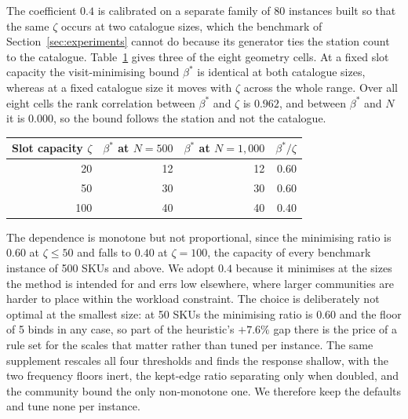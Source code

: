 \documentclass[]{interact}
\begin{document}
The coefficient $0.4$ is calibrated on a separate family of 80 instances built so that the same $\zeta$ occurs at two catalogue sizes, which the benchmark of Section~\ref{sec:experiments} cannot do because its generator ties the station count to the catalogue. Table~\ref{tab:capsweep} gives three of the eight geometry cells. At a fixed slot capacity the visit-minimising bound $\beta^\ast$ is identical at both catalogue sizes, whereas at a fixed catalogue size it moves with $\zeta$ across the whole range. Over all eight cells the rank correlation between $\beta^\ast$ and $\zeta$ is $0.962$, and between $\beta^\ast$ and $N$ it is $0.000$, so the bound follows the station and not the catalogue.

\begin{table}[H]
\centering
{}
{\small\begin{tabular*}{\textwidth}{@{\extracolsep{\fill}}rrrr@{}}
\toprule
Slot capacity $\zeta$ & $\beta^\ast$ at $N=500$ & $\beta^\ast$ at $N=1{,}000$ & $\beta^\ast/\zeta$ \\
\midrule
20  & 12 & 12 & 0.60 \\
50  & 30 & 30 & 0.60 \\
100 & 40 & 40 & 0.40 \\
\bottomrule
\end{tabular*}}
\label{tab:capsweep}
\end{table}

The dependence is monotone but not proportional, since the minimising ratio is $0.60$ at $\zeta\le 50$ and falls to $0.40$ at $\zeta=100$, the capacity of every benchmark instance of 500 SKUs and above. We adopt $0.4$ because it minimises at the sizes the method is intended for and errs low elsewhere, where larger communities are harder to place within the workload constraint. The choice is deliberately not optimal at the smallest size: at 50 SKUs the minimising ratio is $0.60$ and the floor of 5 binds in any case, so part of the heuristic's $+7.6\%$ gap there is the price of a rule set for the scales that matter rather than tuned per instance. The same supplement rescales all four thresholds and finds the response shallow, with the two frequency floors inert, the kept-edge ratio separating only when doubled, and the community bound the only non-monotone one. We therefore keep the defaults and tune none per instance.
\end{document}
